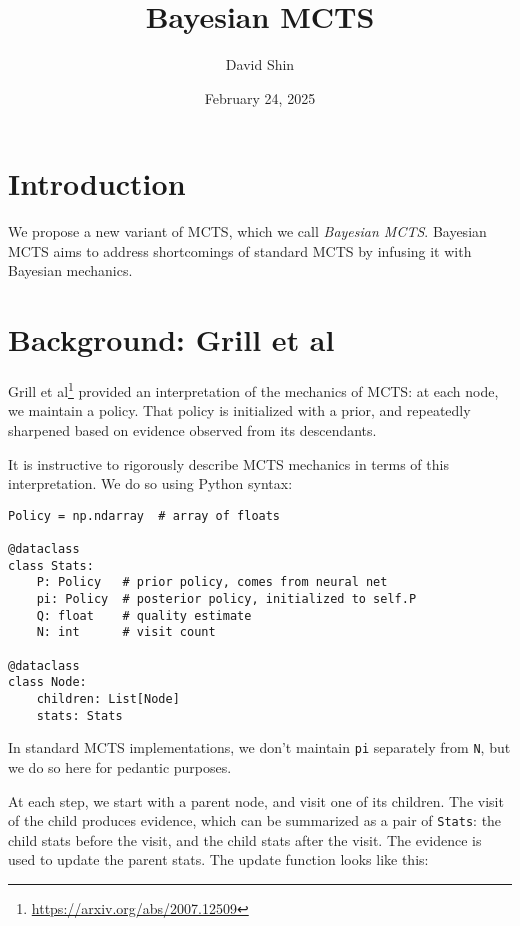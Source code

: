 \documentclass[tikz]{article}
\title{Bayesian MCTS}
\author{David Shin}
\date{February 24, 2025}
\begin{document}
\maketitle

\section{Introduction}

We propose a new variant of MCTS, which we call \textit{Bayesian MCTS}. Bayesian MCTS aims to address shortcomings of standard MCTS
by infusing it with Bayesian mechanics.

\section{Background: Grill et al}

Grill et al\footnote{\url{https://arxiv.org/abs/2007.12509}} provided an interpretation of the mechanics of MCTS: at each node, 
we maintain a policy. That policy is initialized with a prior, and repeatedly sharpened based on evidence observed from its descendants. \newline

It is instructive to rigorously describe MCTS mechanics in terms of this interpretation. We do so using Python syntax:

\begin{tcolorbox}
\begin{verbatim}
Policy = np.ndarray  # array of floats

@dataclass
class Stats:
    P: Policy   # prior policy, comes from neural net
    pi: Policy  # posterior policy, initialized to self.P
    Q: float    # quality estimate
    N: int      # visit count

@dataclass
class Node:
    children: List[Node]
    stats: Stats
\end{verbatim}
\end{tcolorbox}

In standard MCTS implementations, we don't maintain \texttt{pi} separately from \texttt{N}, but we do so here for pedantic purposes. \newline

At each step, we start with a parent node, and visit one of its children. The visit of the child produces evidence, 
which can be summarized as a pair of \texttt{Stats}: the child stats before the visit, 
and the child stats after the visit. The evidence is used to update the parent stats. The update function looks like this:
\end{document}
